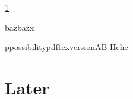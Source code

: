 \documentclass{article}
\begin{document}
\ref{later}

\def\foo{\ifx\bar\undefined\else\bar\fi}
\def\bar#1{baz}
\foo{x}

\def\possibilityA{1}
\def\possibilityB{12}
\def\doubletaker#1#2{#2#1#2}
\expandafter\expandafter\expandafter\doubletaker
  \csname possibility\ifcsname pdftexversion\endcsname A\else B\fi{}%
Hehe
\section{Later}\label{later}
\end{document}

